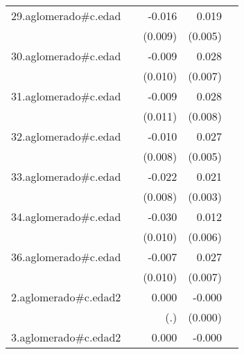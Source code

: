 {\begin{longtable}{l*{4}{D{.}{.}{-1}}}
\addlinespace
29.aglomerado#c.edad&                     &      -0.016         &       0.019\sym{***}&                     \\
            &                     &     (0.009)         &     (0.005)         &                     \\
\addlinespace
30.aglomerado#c.edad&                     &      -0.009         &       0.028\sym{***}&                     \\
            &                     &     (0.010)         &     (0.007)         &                     \\
\addlinespace
31.aglomerado#c.edad&                     &      -0.009         &       0.028\sym{***}&                     \\
            &                     &     (0.011)         &     (0.008)         &                     \\
\addlinespace
32.aglomerado#c.edad&                     &      -0.010         &       0.027\sym{***}&                     \\
            &                     &     (0.008)         &     (0.005)         &                     \\
\addlinespace
33.aglomerado#c.edad&                     &      -0.022\sym{**} &       0.021\sym{***}&                     \\
            &                     &     (0.008)         &     (0.003)         &                     \\
\addlinespace
34.aglomerado#c.edad&                     &      -0.030\sym{**} &       0.012         &                     \\
            &                     &     (0.010)         &     (0.006)         &                     \\
\addlinespace
36.aglomerado#c.edad&                     &      -0.007         &       0.027\sym{***}&                     \\
            &                     &     (0.010)         &     (0.007)         &                     \\
\addlinespace
2.aglomerado#c.edad2&                     &       0.000         &      -0.000\sym{***}&                     \\
            &                     &         (.)         &     (0.000)         &                     \\
\addlinespace
3.aglomerado#c.edad2&                     &       0.000         &      -0.000\sym{***}&                     \\

\end{longtable}}
